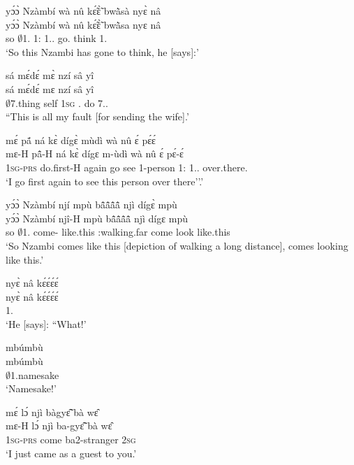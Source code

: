 \begin{exe}[(N234)]
\exN\label{n111}
  \glll yɔ́ɔ̀ Nzàmbí wà nû kɛ̃́ɛ̃̀ bwã̀sà nyɛ̀ nâ \\
         yɔ́ɔ̀ Nzàmbí wà nû kɛ̃́ɛ̃̀ bwã̀sa nyɛ nâ \\
       so $\emptyset$1.{\PN}  1:{\ATT}  1.{\DEM}.{\PROX} go.{\COMPL} think 1.{\SBJ} {\COMP}  \\
    \trans `So this Nzambi has gone to think, he [says]:'
 
\exN\label{n112}
  \glll sá mɛ́dɛ́ mɛ̀ nzí sâ yî \\
        sá mɛ́dɛ́ mɛ nzí sâ yî \\
        $\emptyset$7.thing self 1\textsc{sg} {\PROG}.{\PST}  do 7.{\DEM}.{\PROX} \\
    \trans ``This is all my fault [for sending the wife].'
 
\exN\label{n113}
  \glll mɛ́ pã́ ná kɛ̀ dígɛ̀ mùdì wà nû ɛ́ pɛ́ɛ́\\
        mɛ-H pã̂-H ná kɛ̀ dígɛ m-ùdì wà nû ɛ́ pɛ́-ɛ́\\
        1\textsc{sg}-\textsc{prs} do.first-H again go see {\N}1-person 1:{\ATT}  1.{\DEM}.{\PROX} {\LOC} over.there.{\DIST}\\
    \trans `I go first again to see this person over there''.'
 
\exN\label{n114}
  \glll yɔ́ɔ̀ Nzàmbí njí mpù bã̂ã̂ã̂ã̂ njì dígɛ̀ mpù \\
        yɔ́ɔ̀ Nzàmbí njî-H mpù bã̂ã̂ã̂ã̂ njì dígɛ mpù \\
        so $\emptyset$1.{\PN} come-{\R} like.this {\IDEO}:walking.far come look like.this \\
    \trans `So Nzambi comes like this [depiction of walking a long distance], comes looking like this.'
 
\exN\label{n115}
  \glll nyɛ̀ nâ kɛ́ɛ́ɛ́ɛ́ \\
        nyɛ̀ nâ kɛ́ɛ́ɛ́ɛ́ \\
       1.{\SBJ}  {\COMP} {\EXCL}  \\
    \trans `He [says]: ``What!'
 
\exN\label{n116}
  \glll mbúmbù \\
       mbúmbù \\
        $\emptyset$1.namesake \\
    \trans `Namesake!'
 
\exN\label{n117}
  \glll mɛ́ lɔ́ njì bàgyɛ̃̂ bà wɛ̂ \\
       mɛ-H lɔ́ njì ba-gyɛ̃̂ bà wɛ̂ \\
       1\textsc{sg}-\textsc{prs} {\RETRO}  come ba2-stranger {\AP} 2\textsc{sg}  \\
    \trans `I just came as a guest to you.'
 

\end{exe}
